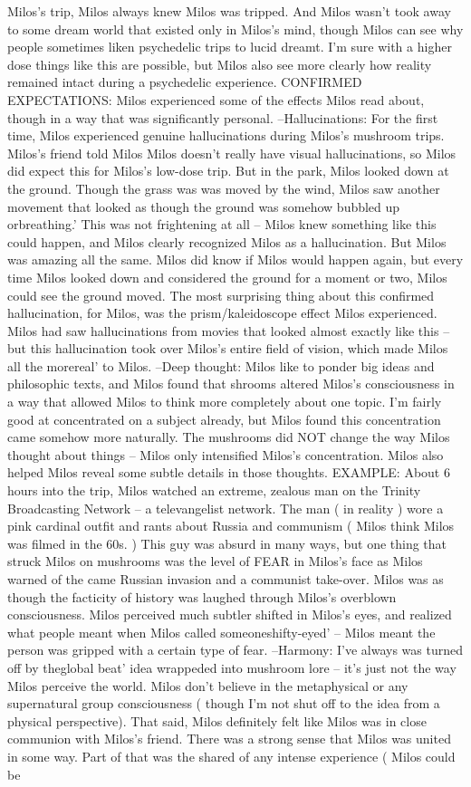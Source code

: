 \documentclass[12pt]{book}
\begin{document}
Milos's trip, Milos always knew Milos was tripped. And Milos wasn't took away to some dream world that existed only in Milos's mind, though Milos can see why people sometimes liken psychedelic trips to lucid dreamt. I'm sure with a higher dose things like this are possible, but Milos also see more clearly how reality remained intact during a psychedelic experience. CONFIRMED EXPECTATIONS: Milos experienced some of the effects Milos read about, though in a way that was significantly personal. --Hallucinations: For the first time, Milos experienced genuine hallucinations during Milos's mushroom trips. Milos's friend told Milos Milos doesn't really have visual hallucinations, so Milos did expect this for Milos's low-dose trip. But in the park, Milos looked down at the ground. Though the grass was was moved by the wind, Milos saw another movement that looked as though the ground was somehow bubbled up orbreathing.' This was not frightening at all -- Milos knew something like this could happen, and Milos clearly recognized Milos as a hallucination. But Milos was amazing all the same. Milos did know if Milos would happen again, but every time Milos looked down and considered the ground for a moment or two, Milos could see the ground moved. The most surprising thing about this confirmed hallucination, for Milos, was the prism/kaleidoscope effect Milos experienced. Milos had saw hallucinations from movies that looked almost exactly like this --but this hallucination took over Milos's entire field of vision, which made Milos all the morereal' to Milos. --Deep thought: Milos like to ponder big ideas and philosophic texts, and Milos found that shrooms altered Milos's consciousness in a way that allowed Milos to think more completely about one topic. I'm fairly good at concentrated on a subject already, but Milos found this concentration came somehow more naturally. The mushrooms did NOT change the way Milos thought about things -- Milos only intensified Milos's concentration. Milos also helped Milos reveal some subtle details in those thoughts. EXAMPLE: About 6 hours into the trip, Milos watched an extreme, zealous man on the Trinity Broadcasting Network -- a televangelist network. The man ( in reality ) wore a pink cardinal outfit and rants about Russia and communism ( Milos think Milos was filmed in the 60s. ) This guy was absurd in many ways, but one thing that struck Milos on mushrooms was the level of FEAR in Milos's face as Milos warned of the came Russian invasion and a communist take-over. Milos was as though the facticity of history was laughed through Milos's overblown consciousness. Milos perceived much subtler shifted in Milos's eyes, and realized what people meant when Milos called someoneshifty-eyed' -- Milos meant the person was gripped with a certain type of fear. --Harmony: I've always was turned off by theglobal beat' idea wrappeded into mushroom lore -- it's just not the way Milos perceive the world. Milos don't believe in the metaphysical or any supernatural group consciousness ( though I'm not shut off to the idea from a physical perspective). That said, Milos definitely felt like Milos was in close communion with Milos's friend. There was a strong sense that Milos was united in some way. Part of that was the shared of any intense experience ( Milos could be 
\end{document}
